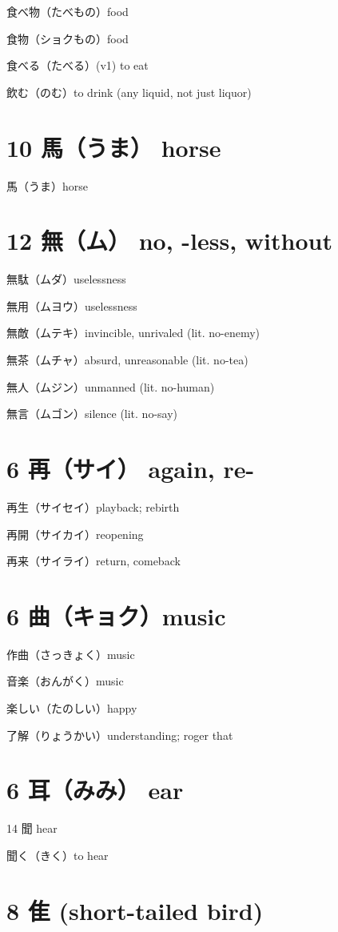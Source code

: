 食べ物（たべもの）food

食物（ショクもの）food

食べる（たべる）(v1) to eat

飲む（のむ）to drink (any liquid, not just liquor)

\section{10 馬（うま） horse}

馬（うま）horse

\section{12 無（ム） no, -less, without}

無駄（ムダ）uselessness

無用（ムヨウ）uselessness

無敵（ムテキ）invincible, unrivaled (lit. no-enemy)

無茶（ムチャ）absurd, unreasonable (lit. no-tea)

無人（ムジン）unmanned (lit. no-human)

無言（ムゴン）silence (lit. no-say)

\section{6 再（サイ） again, re-}

再生（サイセイ）playback; rebirth

再開（サイカイ）reopening

再来（サイライ）return, comeback

\section{6 曲（キョク）music}

作曲（さっきょく）music

音楽（おんがく）music

楽しい（たのしい）happy

了解（りょうかい）understanding; roger that

\section{6 耳（みみ） ear}

14 聞 hear

聞く（きく）to hear

\section{8 隹 (short-tailed bird)}

